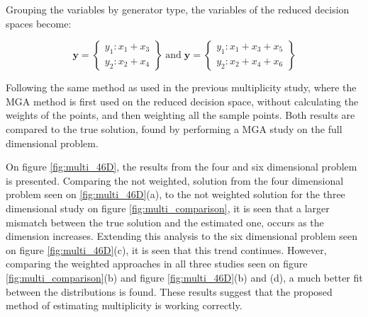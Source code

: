 Grouping the variables by generator type, the variables of the reduced decision spaces become:

\begin{equation*}
\mathbf{y} = 
\begin{Bmatrix}
y_1: x_1 + x_3 \\
y_2: x_2 + x_4
\end{Bmatrix}
\; \text{and} \;
\mathbf{y} = 
\begin{Bmatrix}
y_1: x_1 + x_3 + x_5 \\
y_2: x_2 + x_4 + x_6
\end{Bmatrix}
\end{equation*}

Following the same method as used in the previous multiplicity study, where the MGA method is first used on the reduced decision space, without calculating the weights of the points, and then weighting all the sample points. Both results are compared to the true solution, found by performing a MGA study on the full dimensional problem. 

On figure \ref{fig:multi_46D}, the results from the four and six dimensional problem is presented. Comparing the not weighted, solution from the four dimensional problem seen on \ref{fig:multi_46D}(a), to the not weighted solution for the three dimensional study on figure \ref{fig:multi_comparison}, it is seen that a larger mismatch between the true solution and the estimated one, occurs as the dimension increases. Extending this analysis to the six dimensional problem seen on figure \ref{fig:multi_46D}(c), it is seen that this trend continues. 
However, comparing the weighted approaches in all three studies seen on figure \ref{fig:multi_comparison}(b) and figure \ref{fig:multi_46D}(b) and (d), a much better fit between the distributions is found. These results suggest that the proposed method of estimating multiplicity is working correctly. 

